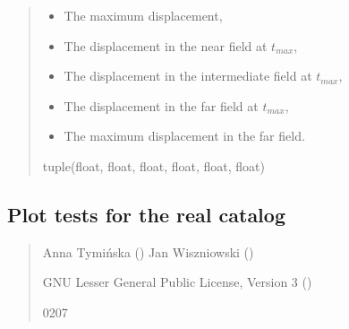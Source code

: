 \documentclass[letterpaper,10pt,english]{sphinxmanual}
\begin{document}
\begin{fulllineitems}
\begin{quote}
\begin{description}
\begin{itemize}
\item {} 
\sphinxAtStartPar
The maximum displacement,

\item {} 
\sphinxAtStartPar
The displacement in the near field at \(t_{max}\),

\item {} 
\sphinxAtStartPar
The displacement in the intermediate field at \(t_{max}\),

\item {} 
\sphinxAtStartPar
The displacement in the far field at \(t_{max}\),

\item {} 
\sphinxAtStartPar
The maximum displacement in the far field.

\end{itemize}


\sphinxAtStartPar
tuple(float, float, float, float, float, float)

\end{description}\end{quote}

\end{fulllineitems}


\subsection{Plot tests for the real catalog}
\label{\detokenize{api_run:plot-tests-for-the-real-catalog}}\label{\detokenize{api_run:module-ssscat}}\begin{quote}\begin{description}
\sphinxAtStartPar
Anna Tymińska ()
Jan Wiszniowski ()

\sphinxAtStartPar
GNU Lesser General Public License, Version 3
()

\sphinxhyphen{}02\sphinxhyphen{}07

\end{description}\end{quote}
\end{document}
